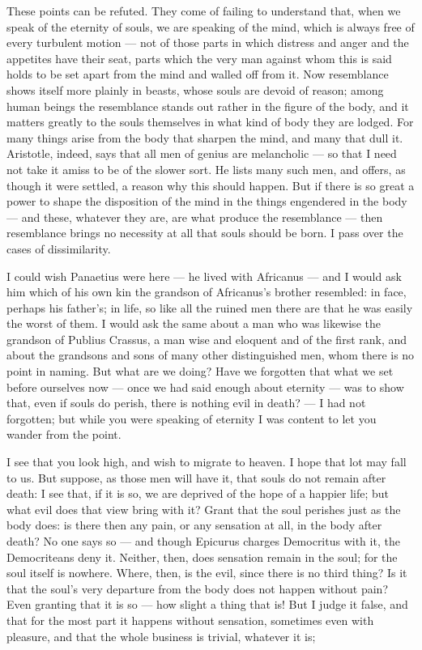  These points can be refuted. They come of failing to understand that, when we speak of the eternity of souls, we are speaking of the mind, which is always free of every turbulent motion — not of those parts in which distress and anger and the appetites have their seat, parts which the very man against whom this is said holds to be set apart from the mind and walled off from it. Now resemblance shows itself more plainly in beasts, whose souls are devoid of reason; among human beings the resemblance stands out rather in the figure of the body, and it matters greatly to the souls themselves in what kind of body they are lodged. For many things arise from the body that sharpen the mind, and many that dull it. Aristotle, indeed, says that all men of genius are melancholic — so that I need not take it amiss to be of the slower sort. He lists many such men, and offers, as though it were settled, a reason why this should happen. But if there is so great a power to shape the disposition of the mind in the things engendered in the body — and these, whatever they are, are what produce the resemblance — then resemblance brings no necessity at all that souls should be born. I pass over the cases of dissimilarity.

 I could wish Panaetius were here — he lived with Africanus — and I would ask him which of his own kin the grandson of Africanus's brother resembled: in face, perhaps his father's; in life, so like all the ruined men there are that he was easily the worst of them. I would ask the same about a man who was likewise the grandson of Publius Crassus, a man wise and eloquent and of the first rank, and about the grandsons and sons of many other distinguished men, whom there is no point in naming. But what are we doing? Have we forgotten that what we set before ourselves now — once we had said enough about eternity — was to show that, even if souls do perish, there is nothing evil in death? — I had not forgotten; but while you were speaking of eternity I was content to let you wander from the point.

 I see that you look high, and wish to migrate to heaven. I hope that lot may fall to us. But suppose, as those men will have it, that souls do not remain after death: I see that, if it is so, we are deprived of the hope of a happier life; but what evil does that view bring with it? Grant that the soul perishes just as the body does: is there then any pain, or any sensation at all, in the body after death? No one says so — and though Epicurus charges Democritus with it, the Democriteans deny it. Neither, then, does sensation remain in the soul; for the soul itself is nowhere. Where, then, is the evil, since there is no third thing? Is it that the soul's very departure from the body does not happen without pain? Even granting that it is so — how slight a thing that is! But I judge it false, and that for the most part it happens without sensation, sometimes even with pleasure, and that the whole business is trivial, whatever it is;

